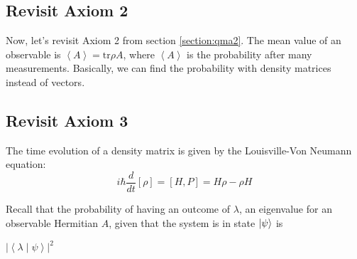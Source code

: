 \documentclass[12pt]{article}
\theoremstyle{plain}
\theoremstyle{nonumberplain}
\theoremstyle{plain}
\theoremstyle{nonumberplain}
\newcommand\1{{\bf 1}}
\newcommand{\<}{\left\langle}
\renewcommand{\>}{\right\rangle}
\newcommand{\inp}[2]{\left\langle#1\mid #2\right\rangle} %
\newcommand{\abs}[1]{\left\lvert #1 \right\rvert} %
\begin{document}
\subsection{Revisit Axiom 2}
Now, let's revisit Axiom 2 from section \ref{section:qma2}. The mean value of an observable is $\left\langle A \right\rangle=\text{tr}{\rho A}$, where $\left\langle A \right\rangle$ is the probability after many measurements. Basically, we can find the probability with density matrices instead of vectors.


\subsection{Revisit Axiom 3}
The time evolution of a density matrix is given by the Louisville-Von Neumann equation:
\begin{equation}
i\hbar \frac{d}{dt}\left[ \rho \right] = \left[ H,P \right]=H\rho-\rho H
\end{equation}



Recall that the probability of having an outcome of $\lambda$, an eigenvalue for an observable Hermitian $A$, given that the system is in state $\ket{\psi}$ is
\begin{center}
$\abs{\inp{\lambda}{\psi}}^2$
\end{center}
\end{document}
